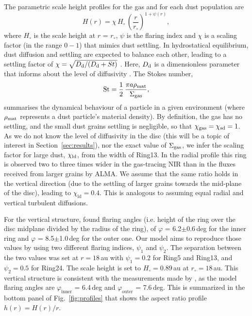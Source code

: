 \documentclass[fleqn,usenatbib,useAMS]{mnras}
\begin{document}
The parametric scale height profiles for the gas and for each dust population are 
\begin{equation}
    \label{scale}
  H(r)=\chi \, H_{\circ} \,\left( \frac{r}{r_{\circ}}\right)^{1+\psi(r)},
\end{equation}
where $H_\circ$ is the scale height at $r$ = $r_\circ$, $\psi$ is the flaring index and $\chi$ is a scaling factor (in the range $0-1$) that mimics dust settling. In hydrostatical equilibrium, dust diffusion and settling are expected to balance each other, leading to a settling factor of $\chi = \sqrt{D_{\rm d}/(D_{\rm d} + St)}$ \citep{Dubrulle1995}. Here, $D_{\rm d}$ is a dimensionless parameter that informs about the level of diffusivity \citep[it is typically assumed to be similar to the level of turbulence for the particle sizes regarded here][]{2007Icar..192..588Y}. The Stokes number,
\begin{equation}
    {\rm St} = \frac{1}{2} \,\frac{\pi a \rho_{\rm mat}}{\Sigma_{\rm gas}}, 
\end{equation}
summarises the dynamical behaviour of a particle in a given environment (where $\rho_{\rm mat}$ represents a dust particle's material density). By definition, the gas has no settling, and the small dust grains settling is negligible, so that $\chi_{\rm gas}=\chi_{\rm sd}=1$. As we do not know the level of diffusivity in the disc (this will be a topic of interest in Section~\ref{sec:results}), nor the exact value of $\Sigma_{\rm gas}$, we infer the scaling factor for large dust, $\chi_{\rm ld}$, from the width of Ring13. In the radial profile this ring is observed two to three times wider in the gas-tracing NIR than in the fluxes received from larger grains by ALMA. We assume that the same ratio holds in the vertical direction (due to the settling of larger grains towards the mid-plane of the disc), leading to $\chi_{\mathrm{ld}}=0.4$. This is analogous to assuming equal radial and vertical turbulent diffusions.

For the vertical structure, \citet{dOrazi} found flaring angles (i.e. height of the ring over the disc midplane divided by the radius of the ring), of $\varphi$ = 6.2$\pm$0.6\,deg for the inner ring and $\varphi$ = 8.5$\pm$1.0\,deg for the outer one. Our model aims to reproduce those values by using two different flaring indices, $\psi_1$ and $\psi_2$. The separation between the two values was set at $r = 18$\,au with $\psi_1=0.2$ for Ring5 and Ring13, and $\psi_2=0.5$ for Ring24. The scale height is set to $H_\circ = 0.89$\,au at $r_\circ = 18$\,au. This vertical structure is consistent with the measurements made by \citet{dOrazi}, as the model flaring angles are $\varphi_{\mathrm{inner}}$ = 6.4\,deg and $\varphi_{\mathrm{outer}}$ = 7.6\,deg. This is summarized in the bottom panel of Fig.~\ref{fig:profiles} that shows the aspect ratio profile $h(r)=H(r)/r$.
\end{document}
